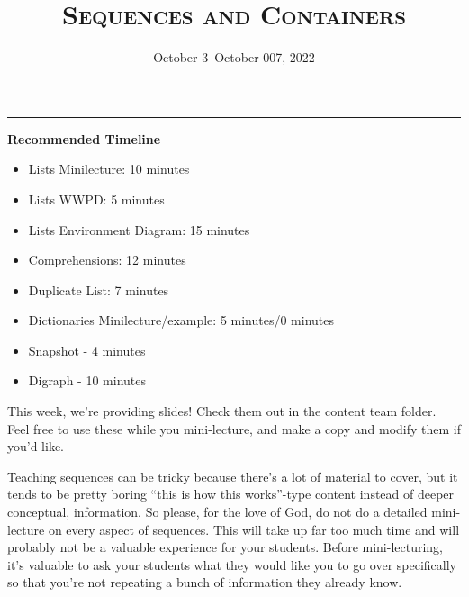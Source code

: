 \documentclass{exam}
\title{\textsc{Sequences and Containers}}
\date{October 3--October 007, 2022}
\begin{document}
\maketitle
\rule{\textwidth}{0.15em}
\fontsize{12}{15}\selectfont


\begin{meta}
    \textbf{Recommended Timeline}
    \begin{itemize}
        \item Lists Minilecture: 10 minutes
        \item Lists WWPD: 5 minutes
        \item Lists Environment Diagram: 15 minutes
        \item Comprehensions: 12 minutes
        \item Duplicate List: 7 minutes
        \item Dictionaries Minilecture/example: 5 minutes/0 minutes
        \item Snapshot - 4 minutes
        \item Digraph - 10 minutes
    \end{itemize}
    This week, we're providing slides! Check them out in the content team folder. Feel free to use these while you mini-lecture, and make a copy and modify them if you'd like. 

    Teaching sequences can be tricky because there's a lot of material to cover, but it tends to be pretty boring ``this is how this works''-type content instead of deeper conceptual, information. So please, for the love of God, do not do a detailed mini-lecture on every aspect of sequences. This will take up far too much time and will probably not be a valuable experience for your students. Before mini-lecturing, it's valuable to ask your students what they would like you to go over specifically so that you're not repeating a bunch of information they already know. 
\end{meta}
\end{document}
